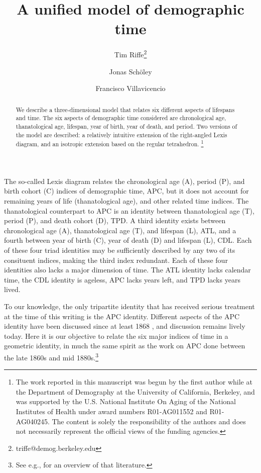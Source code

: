 \documentclass[11pt,oneside]{article} %
\newcommand\ackn[1]{%
  \begingroup
  \renewcommand\thefootnote{}\footnote{#1}%
  \addtocounter{footnote}{-1}%
  \endgroup
}
\begin{document}
\title{A unified model of demographic time}

\author[1]{Tim Riffe\thanks{triffe@demog.berkeley.edu}}
\author[2]{Jonas Sch{\"o}ley}
\author[2]{Francisco Villavicencio}



\maketitle

\begin{abstract}
We describe a three-dimensional model that relates six different aspects of
lifespans and time. The six aspects of demographic time considered are
chronological age, thanatological age, lifespan, year of birth, year of death,
and period. Two versions of the model are described: a relatively intuitive
extension of the right-angled Lexis diagram, and an isotropic extension based on
the regular tetrahedron. \ackn{The work reported in this manuscript was begun by
the first author while at the Department of Demography at the University of
California, Berkeley, and was supported by the U.S.
National Institute On Aging of the National Institutes of Health under award
numbers R01-AG011552 and R01-AG040245. The content is solely the responsibility of the authors and does not necessarily represent the official views of the funding agencies.}

\end{abstract}


The so-called Lexis diagram relates the chronological age (A), period (P), and
birth cohort (C) indices of demographic time, APC, but it does not account
for remaining years of life (thanatological age), and other related time
indices.
The thanatological counterpart to APC is an identity between thanatological age (T), period (P), and death cohort (D), TPD. A third identity exists between
chronological age (A), thanatological age (T), and lifespan (L), ATL, and a
fourth between year of birth (C), year of death (D) and lifespan (L), CDL.
Each of these four triad identities may be sufficiently described by any
two of its consituent indices, making the third index redundant. Each of these
four identities also lacks a major dimension of time. The ATL identity lacks
calendar time, the CDL identity is ageless, APC lacks years left, and TPD lacks years lived. 

To our knowledge, the only tripartite identity that has received serious
treatment at the time of this writing is the APC identity. Different aspects of
the APC identity have been discussed since at least 1868
\citep{knapp1868ermittlung}, and discussion remains lively today. Here it is our
objective to relate the six major indices of time in a geometric identity, in
much the same spirit as the work on APC done between the late 1860s and mid 1880s.\footnote{See e.g., \citet{keiding2011age}
for an overview of that literature.} 
\end{document}
